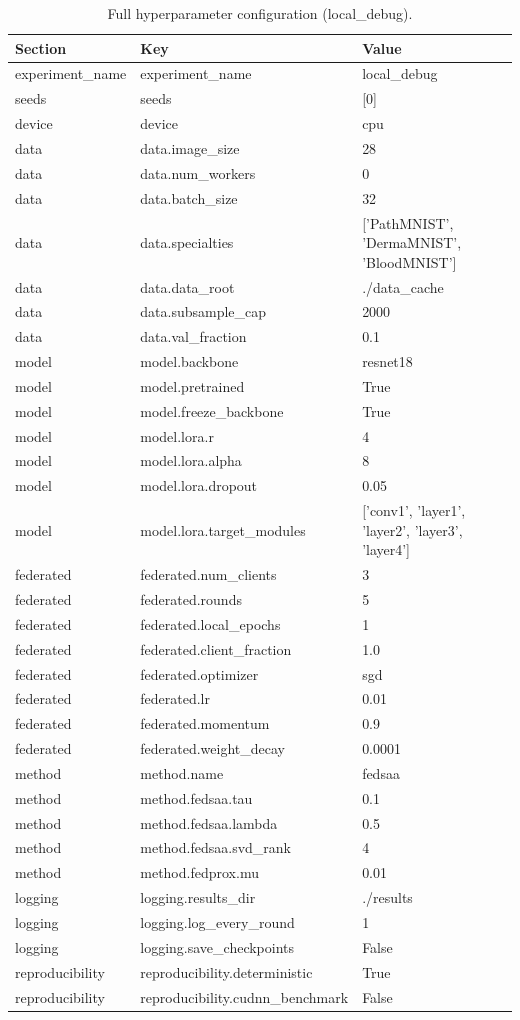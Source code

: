 \begin{table}[t]
\centering
\caption{Full hyperparameter configuration (local_debug).}
\label{tab:hyperparameters}
\begin{tabular}{lll}
\toprule
Section & Key & Value \\
\midrule
experiment\_name & experiment\_name & local\_debug \\
seeds & seeds & [0] \\
device & device & cpu \\
data & data.image\_size & 28 \\
data & data.num\_workers & 0 \\
data & data.batch\_size & 32 \\
data & data.specialties & ['PathMNIST', 'DermaMNIST', 'BloodMNIST'] \\
data & data.data\_root & ./data\_cache \\
data & data.subsample\_cap & 2000 \\
data & data.val\_fraction & 0.1 \\
model & model.backbone & resnet18 \\
model & model.pretrained & True \\
model & model.freeze\_backbone & True \\
model & model.lora.r & 4 \\
model & model.lora.alpha & 8 \\
model & model.lora.dropout & 0.05 \\
model & model.lora.target\_modules & ['conv1', 'layer1', 'layer2', 'layer3', 'layer4'] \\
federated & federated.num\_clients & 3 \\
federated & federated.rounds & 5 \\
federated & federated.local\_epochs & 1 \\
federated & federated.client\_fraction & 1.0 \\
federated & federated.optimizer & sgd \\
federated & federated.lr & 0.01 \\
federated & federated.momentum & 0.9 \\
federated & federated.weight\_decay & 0.0001 \\
method & method.name & fedsaa \\
method & method.fedsaa.tau & 0.1 \\
method & method.fedsaa.lambda & 0.5 \\
method & method.fedsaa.svd\_rank & 4 \\
method & method.fedprox.mu & 0.01 \\
logging & logging.results\_dir & ./results \\
logging & logging.log\_every\_round & 1 \\
logging & logging.save\_checkpoints & False \\
reproducibility & reproducibility.deterministic & True \\
reproducibility & reproducibility.cudnn\_benchmark & False \\
\bottomrule
\end{tabular}
\end{table}
